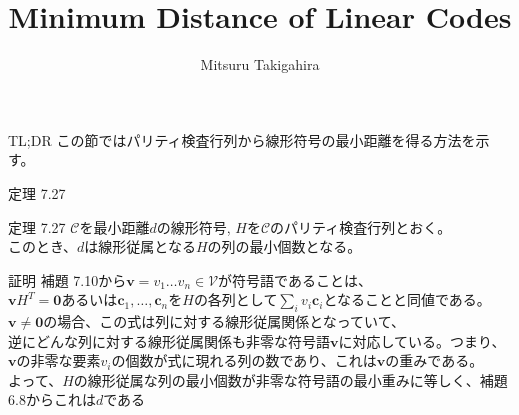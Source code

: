 \documentclass[dvipdfmx,10pt,jsarticle]{beamer}
\title{Minimum Distance of Linear Codes}
\author{Mitsuru Takigahira}
\date[2017/12/01]{}
\newcommand{\code}[1]{\mathcal{#1}}
\newcommand{\vs}[1]{\mathcal{#1}}
\renewcommand{\vec}[1]{\mathbf{#1}}
\begin{document}
  \frame{\maketitle}

  \begin{frame}{TL;DR}
    この節ではパリティ検査行列から線形符号の最小距離を得る方法を示す。
  \end{frame}

  \begin{frame}{定理 7.27}
    \begin{block}{定理 7.27}
      $\code{C}$を最小距離$d$の線形符号, $H$を$\code{C}$のパリティ検査行列とおく。 \\
      このとき、$d$は線形従属となる$H$の列の最小個数となる。
    \end{block}
    \begin{block}{証明}
      補題 7.10から$\vec{v} = v_1\ldots v_n \in \vs{V}$が符号語であることは、\\
      $\vec{v}H^T = \vec{0}$あるいは$\vec{c}_1, \ldots, \vec{c}_n$を$H$の各列として$\sum_{i} v_i \vec{c}_i$となることと同値である。 \\
      $\vec{v} \neq \vec{0}$の場合、この式は列に対する線形従属関係となっていて、  \\
      逆にどんな列に対する線形従属関係も非零な符号語$\vec{v}$に対応している。つまり、 \\
      $\vec{v}$の非零な要素$v_i$の個数が式に現れる列の数であり、これは$\vec{v}$の重みである。 \\
      よって、$H$の線形従属な列の最小個数が非零な符号語の最小重みに等しく、補題 6.8からこれは$d$である
    \end{block}
  \end{frame}
\end{document}
